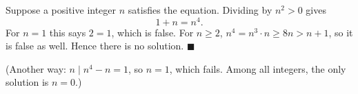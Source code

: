 Suppose a positive integer $n$ satisfies the equation. Dividing by $n^2>0$ gives
\[1+n=n^4.\]
For $n=1$ this says $2=1$, which is false. For $n\ge2$, $n^4=n^3\cdot n\ge8n>n+1$, so it is false as well. Hence there is no solution. $\blacksquare$

(Another way: $n\mid n^4-n=1$, so $n=1$, which fails. Among all integers, the only solution is $n=0$.)
